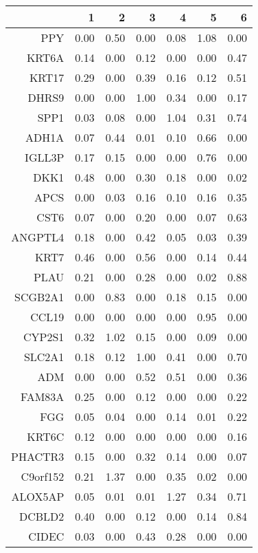 \begin{longtable}{rrrrrrr}
  \hline
 & 1 & 2 & 3 & 4 & 5 & 6 \\ 
  \hline
PPY & 0.00 & 0.50 & 0.00 & 0.08 & 1.08 & 0.00 \\ 
  KRT6A & 0.14 & 0.00 & 0.12 & 0.00 & 0.00 & 0.47 \\ 
  KRT17 & 0.29 & 0.00 & 0.39 & 0.16 & 0.12 & 0.51 \\ 
  DHRS9 & 0.00 & 0.00 & 1.00 & 0.34 & 0.00 & 0.17 \\ 
  SPP1 & 0.03 & 0.08 & 0.00 & 1.04 & 0.31 & 0.74 \\ 
  ADH1A & 0.07 & 0.44 & 0.01 & 0.10 & 0.66 & 0.00 \\ 
  IGLL3P & 0.17 & 0.15 & 0.00 & 0.00 & 0.76 & 0.00 \\ 
  DKK1 & 0.48 & 0.00 & 0.30 & 0.18 & 0.00 & 0.02 \\ 
  APCS & 0.00 & 0.03 & 0.16 & 0.10 & 0.16 & 0.35 \\ 
  CST6 & 0.07 & 0.00 & 0.20 & 0.00 & 0.07 & 0.63 \\ 
  ANGPTL4 & 0.18 & 0.00 & 0.42 & 0.05 & 0.03 & 0.39 \\ 
  KRT7 & 0.46 & 0.00 & 0.56 & 0.00 & 0.14 & 0.44 \\ 
  PLAU & 0.21 & 0.00 & 0.28 & 0.00 & 0.02 & 0.88 \\ 
  SCGB2A1 & 0.00 & 0.83 & 0.00 & 0.18 & 0.15 & 0.00 \\ 
  CCL19 & 0.00 & 0.00 & 0.00 & 0.00 & 0.95 & 0.00 \\ 
  CYP2S1 & 0.32 & 1.02 & 0.15 & 0.00 & 0.09 & 0.00 \\ 
  SLC2A1 & 0.18 & 0.12 & 1.00 & 0.41 & 0.00 & 0.70 \\ 
  ADM & 0.00 & 0.00 & 0.52 & 0.51 & 0.00 & 0.36 \\ 
  FAM83A & 0.25 & 0.00 & 0.12 & 0.00 & 0.00 & 0.22 \\ 
  FGG & 0.05 & 0.04 & 0.00 & 0.14 & 0.01 & 0.22 \\ 
  KRT6C & 0.12 & 0.00 & 0.00 & 0.00 & 0.00 & 0.16 \\ 
  PHACTR3 & 0.15 & 0.00 & 0.32 & 0.14 & 0.00 & 0.07 \\ 
  C9orf152 & 0.21 & 1.37 & 0.00 & 0.35 & 0.02 & 0.00 \\ 
  ALOX5AP & 0.05 & 0.01 & 0.01 & 1.27 & 0.34 & 0.71 \\ 
  DCBLD2 & 0.40 & 0.00 & 0.12 & 0.00 & 0.14 & 0.84 \\ 
  CIDEC & 0.03 & 0.00 & 0.43 & 0.28 & 0.00 & 0.00 \\ 

\end{longtable}
